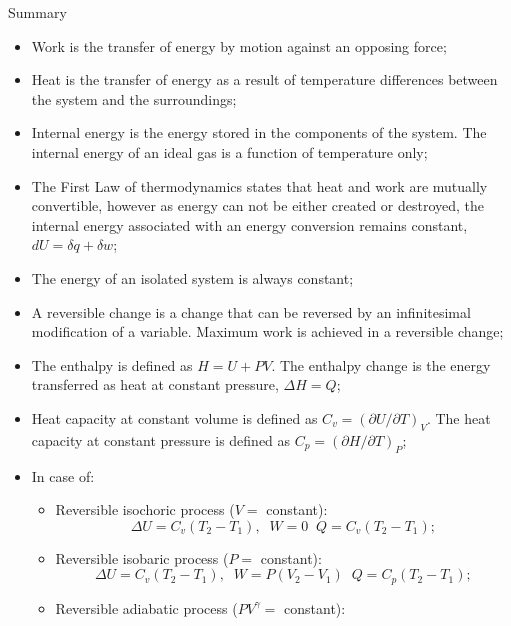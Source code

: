    
\clearpage   
\begin{FinalSummaryBlock}{Summary}
    \begin{itemize}
       \item Work is the transfer of energy by motion against an opposing force;
       \item Heat is the transfer of energy as a result of temperature differences between the system and the surroundings;
       \item Internal energy is the energy stored in the components of the system. The internal energy of an ideal gas is a function of temperature only;
       \item The First Law of thermodynamics states that heat and work are mutually convertible, however as energy can not be either created or destroyed, the internal energy associated with an energy conversion remains constant, $dU = \delta q + \delta w$;
       \item The energy of an isolated system is always constant;
       \item A reversible change is a change that can be reversed by an infinitesimal modification of a variable. Maximum work is achieved in a reversible change;
       \item The enthalpy is defined as $H = U + PV$. The enthalpy change is the energy transferred as heat at constant pressure, $\Delta H = Q$;
       \item Heat capacity at constant volume is defined as $C_{v}=\left(\partial U / \partial T\right)_{V}$. The heat capacity at constant pressure is defined as $C_{p}=\left(\partial H / \partial T\right)_{P}$;
       \item In case of:
         \begin{itemize}
            \item Reversible isochoric process (\ie $V=$ constant):
              \begin{displaymath}
                \Delta U = C_{v}\left(T_{2}-T_{1}\right), \;\; W = 0\;\; Q = C_{v}\left(T_{2}-T_{1}\right);
              \end{displaymath}
            \item Reversible isobaric process (\ie $P=$ constant):
              \begin{displaymath}
                \Delta U = C_{v}\left(T_{2}-T_{1}\right), \;\; W = P\left(V_{2}-V_{1}\right)\;\; Q = C_{p}\left(T_{2}-T_{1}\right);
              \end{displaymath}
            \item Reversible adiabatic process (\ie $PV^{\gamma}=$ constant):

\end{itemize}
\end{itemize}
\end{FinalSummaryBlock}
